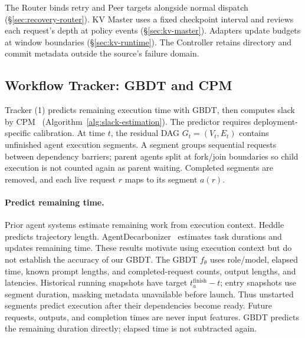 The Router binds retry and Peer targets alongside normal dispatch
(\S\ref{sec:recovery-router}). KV Master uses a fixed checkpoint
interval and reviews each request's depth at policy events
(\S\ref{sec:kv-master}). Adapters update budgets at window boundaries
(\S\ref{sec:kv-runtime}). The Controller
retains directory and commit metadata outside the source's failure domain.
\subsection{Workflow Tracker: GBDT and CPM}
\label{sec:workflow-protection}

Tracker (1) predicts remaining execution time with GBDT, then computes
slack by CPM~\cite{kelley1959cpm} (Algorithm~\ref{alg:slack-estimation}).
The predictor requires deployment-specific calibration.
At time $t$, the residual DAG $G_t=(V_t,E_t)$ contains unfinished agent
execution segments. A segment groups sequential requests between
dependency barriers; parent agents split at fork/join boundaries so
child execution is not counted again as parent waiting. Completed
segments are removed, and each live request $r$ maps to its segment $a(r)$.

\paragraph{Predict remaining time.}
Prior agent systems estimate remaining work from execution context.
Heddle~\cite{zhang2026heddle} predicts trajectory length.
AgentDecarbonizer~\cite{yan2026agentdecarbonizer} estimates task durations
and updates remaining time. These results motivate
using execution context but do not establish the accuracy of our GBDT.
The GBDT $f_\theta$ uses role/model, elapsed time, known prompt lengths,
and completed-request counts, output lengths, and latencies.
Historical running snapshots have target $t_a^{\mathrm{finish}}-t$;
entry snapshots use segment duration, masking metadata unavailable
before launch. Thus unstarted segments predict execution after their
dependencies become ready. Future requests, outputs, and completion
times are never input features. GBDT predicts the remaining duration
directly; elapsed time is not subtracted again.

